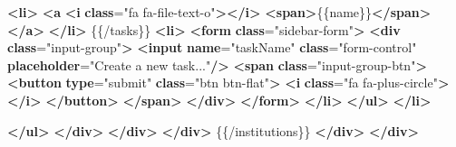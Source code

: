 \documentclass[
  11pt,
]{krantz}
\newenvironment{Shaded}{\begin{snugshade}}{\end{snugshade}}
\newcommand{\ErrorTok}[1]{\textcolor[rgb]{0.14,0.14,0.14}{\textbf{#1}}}
\newcommand{\KeywordTok}[1]{\textcolor[rgb]{0.27,0.27,0.27}{\textbf{#1}}}
\newcommand{\NormalTok}[1]{#1}
\newcommand{\OtherTok}[1]{\textcolor[rgb]{0.37,0.37,0.37}{#1}}
\newcommand{\StringTok}[1]{\textcolor[rgb]{0.5,0.5,0.5}{#1}}
\begin{document}
\begin{Shaded}
\begin{Highlighting}[]
                                        \KeywordTok{\textless{}li\textgreater{}}
                                            \KeywordTok{\textless{}a} \ErrorTok{\textless{}i} \ErrorTok{class}\OtherTok{=}\StringTok{"fa fa{-}file{-}text{-}o"}\KeywordTok{\textgreater{}\textless{}/i\textgreater{}}
                                                \KeywordTok{\textless{}span\textgreater{}}\NormalTok{\{\{name\}\}}\KeywordTok{\textless{}/span\textgreater{}}
                                            \KeywordTok{\textless{}/a\textgreater{}}
                                        \KeywordTok{\textless{}/li\textgreater{}}
\NormalTok{                                    \{\{/tasks\}\}}
                                    \KeywordTok{\textless{}li\textgreater{}}
                                        \KeywordTok{\textless{}form} \ErrorTok{class}\OtherTok{=}\StringTok{"sidebar{-}form"}\KeywordTok{\textgreater{}}
                                            \KeywordTok{\textless{}div} \ErrorTok{class}\OtherTok{=}\StringTok{"input{-}group"}\KeywordTok{\textgreater{}}
                                                \KeywordTok{\textless{}input} \ErrorTok{name}\OtherTok{=}\StringTok{"taskName"} \ErrorTok{class}\OtherTok{=}\StringTok{"form{-}control"} \ErrorTok{placeholder}\OtherTok{=}\StringTok{"Create a new task..."}\KeywordTok{/\textgreater{}}
                                                \KeywordTok{\textless{}span} \ErrorTok{class}\OtherTok{=}\StringTok{"input{-}group{-}btn"}\KeywordTok{\textgreater{}}
                                                \KeywordTok{\textless{}button} \ErrorTok{type}\OtherTok{=}\StringTok{"submit"} \ErrorTok{class}\OtherTok{=}\StringTok{"btn btn{-}flat"}\KeywordTok{\textgreater{}}
                                                    \KeywordTok{\textless{}i} \ErrorTok{class}\OtherTok{=}\StringTok{"fa fa{-}plus{-}circle"}\KeywordTok{\textgreater{}\textless{}/i\textgreater{}}
                                                \KeywordTok{\textless{}/button\textgreater{}}
                                        \KeywordTok{\textless{}/span\textgreater{}}
                                            \KeywordTok{\textless{}/div\textgreater{}}
                                        \KeywordTok{\textless{}/form\textgreater{}}
                                    \KeywordTok{\textless{}/li\textgreater{}}
                                \KeywordTok{\textless{}/ul\textgreater{}}
                            \KeywordTok{\textless{}/li\textgreater{}}

                        \KeywordTok{\textless{}/ul\textgreater{}}
                    \KeywordTok{\textless{}/div\textgreater{}}
                \KeywordTok{\textless{}/div\textgreater{}}
            \KeywordTok{\textless{}/div\textgreater{}}
\NormalTok{        \{\{/institutions\}\}}
    \KeywordTok{\textless{}/div\textgreater{}}
\KeywordTok{\textless{}/div\textgreater{}}
\end{Highlighting}
\end{Shaded}
\end{document}

